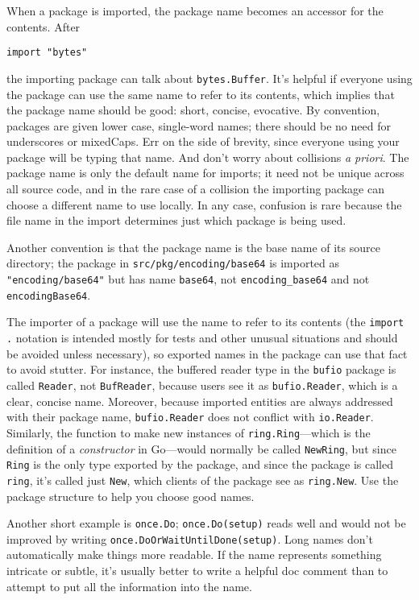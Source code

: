 When a package is imported, the package name becomes an accessor for the
contents. After

\begin{Verbatim}[frame=single]
import "bytes"
\end{Verbatim}

the importing package can talk about \texttt{bytes.Buffer}. It's helpful
if everyone using the package can use the same name to refer to its
contents, which implies that the package name should be good: short,
concise, evocative. By convention, packages are given lower case,
single-word names; there should be no need for underscores or mixedCaps.
Err on the side of brevity, since everyone using your package will be
typing that name. And don't worry about collisions \emph{a priori}. The
package name is only the default name for imports; it need not be unique
across all source code, and in the rare case of a collision the
importing package can choose a different name to use locally. In any
case, confusion is rare because the file name in the import determines
just which package is being used.

Another convention is that the package name is the base name of its
source directory; the package in \texttt{src/pkg/encoding/base64} is
imported as \texttt{"encoding/base64"} but has name \texttt{base64}, not
\texttt{encoding\_base64} and not \texttt{encodingBase64}.

The importer of a package will use the name to refer to its contents
(the \texttt{import .} notation is intended mostly for tests and other
unusual situations and should be avoided unless necessary), so exported
names in the package can use that fact to avoid stutter. For instance,
the buffered reader type in the \texttt{bufio} package is called
\texttt{Reader}, not \texttt{BufReader}, because users see it as
\texttt{bufio.Reader}, which is a clear, concise name. Moreover, because
imported entities are always addressed with their package name,
\texttt{bufio.Reader} does not conflict with \texttt{io.Reader}.
Similarly, the function to make new instances of
\texttt{ring.Ring}---which is the definition of a \emph{constructor} in
Go---would normally be called \texttt{NewRing}, but since \texttt{Ring}
is the only type exported by the package, and since the package is
called \texttt{ring}, it's called just \texttt{New}, which clients of
the package see as \texttt{ring.New}. Use the package structure to help
you choose good names.

Another short example is \texttt{once.Do}; \texttt{once.Do(setup)} reads
well and would not be improved by writing
\texttt{once.DoOrWaitUntilDone(setup)}. Long names don't automatically
make things more readable. If the name represents something intricate or
subtle, it's usually better to write a helpful doc comment than to
attempt to put all the information into the name.

